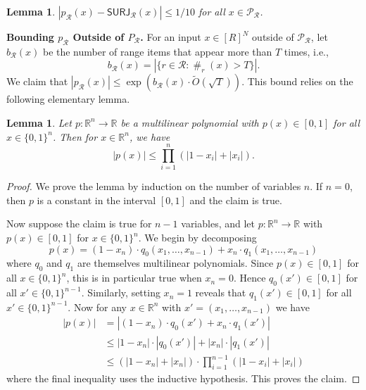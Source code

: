 \documentclass[11pt, letterpaper, fleqn]{article}
\newtheorem{lemma}[theorem]{Lemma}
\theoremstyle{plain}
\newcommand{\R}{\mathbb{R}}
\renewcommand{\P}{\mathcal{P}}
\newcommand{\SURJ}{\mathsf{ SURJ}}
\newcommand{\B}{\{0,1\}}
\newcommand{\tO}{\tilde{O}}
\newcommand{\Rcal}{\mathcal{R}}
\newcommand{\fr}{\operatorname{\#}}
\begin{document}
\begin{lemma} \label{approxlemma} $|p_{\mathcal{R}}(x) - \SURJ_{\Rcal}(x)| \leq 1/10$
for all $x \in \P_\Rcal$. \end{lemma}

\medskip \noindent \textbf{Bounding $p_{\mathcal{R}}$ Outside of $P_{\mathcal{R}}$.}
For an input $x\in [R]^N$ outside of $\P_\Rcal$, let $b_\Rcal(x)$ be the number of range items that appear more than $T$ times, i.e., 
\begin{equation}\label{eq:b}
    b_\Rcal(x) = |\{r\in\Rcal:\fr_r(x)>T\}|.
\end{equation}
We claim that $|p_{\mathcal{R}}(x) | \leq {\exp\left(b_\Rcal(x) \cdot \tO(\sqrt{T})\right)}$. This bound relies on the following elementary lemma.


\begin{lemma} \label{lem:real-bound}
Let $p : \R^n \to \R$ be a multilinear polynomial with $p(x) \in [0, 1]$ for all $x \in \B^n$. Then for $x \in \R^n$, we have
\[|p(x)| \le \prod_{i = 1}^n (|1 - x_i| + |x_i|).\]
\end{lemma}

\begin{proof}
We prove the lemma by induction on the number of variables $n$. If $n = 0$, then $p$ is a constant in the interval $[0, 1]$ and the claim is true.

Now suppose the claim is true for $n-1$ variables, and let $p : \R^n \to \R$ with $p(x) \in [0, 1]$ for $x \in \B^n$. We begin by decomposing
\[p(x) = (1-x_n) \cdot q_0(x_1, \dots, x_{n-1}) + x_n \cdot q_1(x_1, \dots, x_{n-1})\]
where $q_0$ and $q_1$ are themselves multilinear polynomials. Since $p(x) \in [0, 1]$ for all $x \in \B^n$, this is in particular true when $x_n = 0$. Hence $q_0(x') \in [0, 1]$ for all $x' \in \B^{n-1}$. Similarly, setting $x_n = 1$ reveals that $q_1(x') \in [0, 1]$ for all $x' \in \B^{n-1}$. Now for any $x \in \R^n$ with $x' = (x_1, \dots, x_{n-1})$ we have
\begin{align*}
|p(x)| &= \left| (1 - x_n) \cdot q_0(x') + x_n \cdot q_1(x')\right| \\
&\le |1 - x_n| \cdot |q_0(x')| + |x_n| \cdot |q_1(x')| \\
&\le (|1 - x_n| + |x_n|) \cdot \prod_{i = 1}^{n-1} (|1 - x_i| + |x_i|)
\end{align*}
where the final inequality uses the inductive hypothesis. This proves the claim.
\end{proof}
\end{document}
